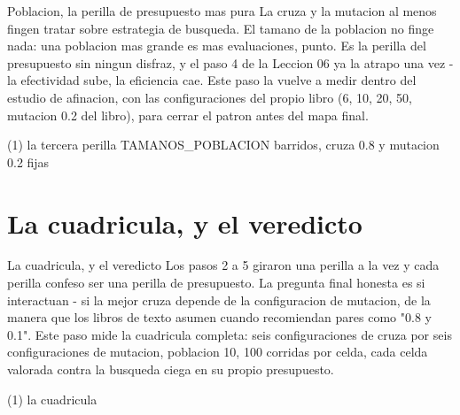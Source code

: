 \begin{frame}{Poblacion, la perilla de presupuesto mas pura}
La cruza y la mutacion al menos fingen tratar sobre estrategia de busqueda.
El tamano de la poblacion no finge nada: una poblacion mas grande es mas evaluaciones,
punto. Es la perilla del presupuesto sin ningun disfraz, y el paso 4 de la Leccion 06
ya la atrapo una vez - la efectividad sube, la eficiencia cae. Este paso
la vuelve a medir dentro del estudio de afinacion, con las configuraciones del propio
libro (6, 10, 20, 50, mutacion 0.2 del libro), para cerrar el patron antes del
mapa final.
\end{frame}

\begin{frame}[fragile]{(1) la tercera perilla TAMANOS\_POBLACION barridos, cruza 0.8 y mutacion 0.2 fijas}

\end{frame}


\section{La cuadricula, y el veredicto}

\begin{frame}{La cuadricula, y el veredicto}
Los pasos 2 a 5 giraron una perilla a la vez y cada perilla confeso ser una
perilla de presupuesto. La pregunta final honesta es si interactuan - si
la mejor cruza depende de la configuracion de mutacion, de la manera que los libros de texto
asumen cuando recomiendan pares como "0.8 y 0.1". Este paso mide la
cuadricula completa: seis configuraciones de cruza por seis configuraciones de mutacion, poblacion
10, 100 corridas por celda, cada celda valorada contra la busqueda ciega en su propio
presupuesto.
\end{frame}

\begin{frame}[fragile]{(1) la cuadricula}

\end{frame}

